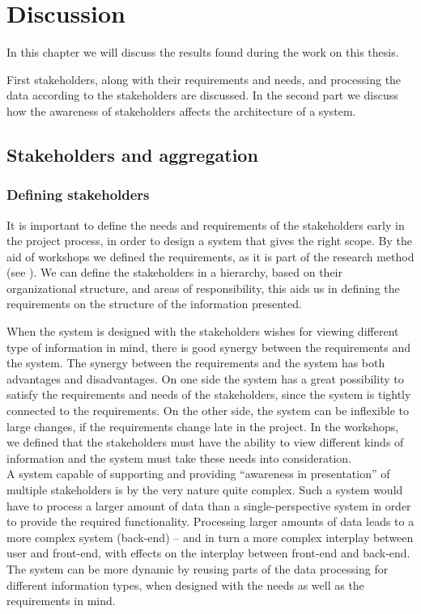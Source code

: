 \chapter{Discussion}
\label{chapter:discussion}
In this chapter we will discuss the results found during the work on this
thesis. 

First stakeholders, along with their requirements and needs, and processing the
data according to the stakeholders are discussed. In the second part we discuss
how the awareness of stakeholders affects the architecture of a system.


\section{Stakeholders and aggregation} %
\label{sec:discussion_stakeholders'_and_aggregation}
\subsection{Defining stakeholders} %
\label{sub:disc_defining_stakeholders}
It is important to define the needs and requirements of the stakeholders 
early in the project process, in order to design a system that gives the right scope. 
By the aid of workshops we defined the requirements, as it is part of the 
research method (see ). We can define the stakeholders in 
a hierarchy, based on their organizational structure, and areas of 
responsibility, this aids us in defining the requirements on the structure of 
the information presented.

When the system is designed with the stakeholders wishes for viewing different type of information in mind, there is good synergy between the requirements and the system. The synergy between the requirements and the system has 
both advantages and disadvantages. On one side the system has a great 
possibility to satisfy the requirements and needs of the stakeholders, since 
the system is tightly connected to the requirements. On the other side, the 
system can be inflexible to large changes, if the requirements change late in 
the project. In the workshops, we defined that the stakeholders must have the 
ability to view different kinds of information and the system must take these 
needs into consideration. \\

A system capable of supporting and providing 
“awareness in presentation” of multiple stakeholders is by the very nature 
quite complex. Such a system would have to process a larger amount of data than 
a single-perspective system in order to provide the required functionality. 
Processing larger amounts of data leads to a more complex system (back-end) – 
and in turn a more complex interplay between user and front-end, with effects 
on the interplay between front-end and back-end. The system can be more 
dynamic by reusing parts of the data processing for 
different information types, when designed with the needs as well as the 
requirements in mind. 

